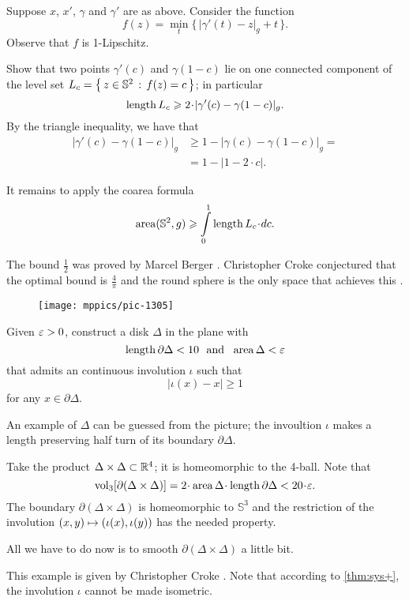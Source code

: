 Suppose $x$, $x'$, $\gamma$ and $\gamma'$ are as above.
Consider the function
\[f(z)=\min_t \{\,|\gamma'(t)-z|_g+t\,\}.\]
Observe that $f$ is 1-Lipschitz.

Show that two points $\gamma'(c)$ and $\gamma(1-c)$ lie on one connected component of the level set $L_c=\left\{\,{z\in\mathbb{S}^2}\,:\,{f(z)=c}\,\right\}$;
in particular 
\[\length L_c\ge 2\cdot|\gamma'(c)-\gamma(1-c)|_g.\]
By the triangle inequality, we have that
\begin{align*}
|\gamma'(c)-\gamma(1-c)|_g&\ge 1-|\gamma(c)-\gamma(1-c)|_g=
\\
&=1-|1-2\cdot c|.
\end{align*}

It remains to apply the coarea formula
\[\area(\mathbb{S}^2,g)\ge \int\limits_0^1\length L_c\cdot dc.\]

The bound $\tfrac12$ was proved by Marcel Berger \cite{berger}. 
Christopher Croke conjectured that the optimal bound is $\tfrac4\pi$ and the round sphere is the only space that achieves this \cite[Conjecture 0.3 in][]{croke}.

\begin{wrapfigure}{r}{20 mm}
\vskip-0mm
\centering
\texttt{[image: mppics/pic-1305]}
\end{wrapfigure}

Given $\varepsilon>0$, construct a disk $\Delta$ in the plane with 
\[\mathop{\rm length}\nolimits\partial \Delta<10\ \ \text{and}\ \ \operatorname{\rm area}\nolimits \Delta<\varepsilon\]
that admits an continuous involution $\iota$ such that 
\[|\iota(x)-x|\ge 1\]
for any $x\in\partial \Delta$.

An example of $\Delta$ can be guessed from the picture;
the invoultion $\iota$ makes a length preserving half turn of its boundary $\partial \Delta$.


Take the product $\Delta\times \Delta\subset \mathbb{R}^4$;
it is homeomorphic to the 4-ball.
Note that 
$$\vol_3[\partial(\Delta\times \Delta)]=2\cdot\area \Delta\cdot\length \partial \Delta<20\cdot\eps.$$
The boundary $\partial(\Delta\times \Delta)$ is homeomorphic to $\mathbb{S}^3$
and the restriction of the involution $(x,y)\z\mapsto (\iota(x),\iota(y))$ has the needed property.

All we have to do now is to smooth $\partial(\Delta\times \Delta)$ a little bit.

 This example is given by Christopher Croke \cite{croke}.
Note that according to \ref{thm:sys+}, 
the involution $\iota$ cannot be made isometric.

